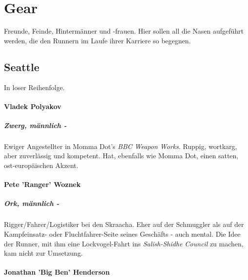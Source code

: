 \chapter{Gear} \label{gear}

Freunde, Feinde, Hintermänner und -frauen. Hier sollen all die Nasen aufgeführt werden, die den Runnern im Laufe ihrer Karriere so begegnen.

%
%
%

\section{Seattle}

In loser Reihenfolge.

    \subsubsection{Vladek Polyakov}
    \paragraph{Zwerg, männlich -} Ewiger Angestellter in Momma Dot's \textit{BBC Weapon Works}. Ruppig, wortkarg, aber zuverlässig und kompetent. Hat, ebenfalls wie Momma Dot, einen satten, ost-europäischen Akzent.
    
    
    \subsubsection{Pete 'Ranger' Woznek}
    \paragraph{Ork, männlich -} Rigger/Fahrer/Logistiker bei den Skraacha. Eher auf der Schmuggler als auf der Kampfeinsatz- oder Fluchtfahrer-Seite seines Geschäfts - auch mental. Die Idee der Runner, mit ihm eine Lockvogel-Fahrt ins \textit{Salish-Shidhe Council} zu machen, kam nicht zur Umsetzung.
    
    
    \subsubsection{Jonathan 'Big Ben' Henderson}
